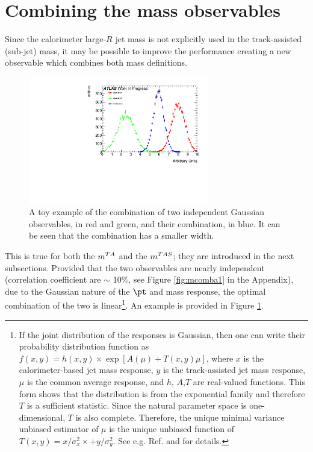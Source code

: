 \section{Combining the mass observables}


Since the calorimeter large-$R$ jet mass is not explicitly used in the track-assisted (sub-jet) mass, it may be possible to improve the performance creating a new observable which combines both mass definitions.


\begin{figure}[!ht]
  \centering
      \includegraphics[width=0.7\textwidth]{jet_part/mcomb/example.pdf}
  \caption[Toy example of Gaussian combination]{A toy example of the combination of two independent Gaussian observables, in red and green, and their combination, in blue. It can be seen that the combination has a smaller width.}
  \label{fig:mcomb1}
\end{figure}

This is true for both the $m^{TA}$ and the $m^{TAS}$; they are introduced in the next subsections.
Provided that the two observables are nearly independent (correlation coefficient are $\sim$ 10\%, see Figure \ref{fig:mcomba1} in the Appendix), due to the Gaussian nature of the $\pt$ and mass response, the optimal combination of the two is linear\footnote{If the joint distribution of the responses is Gaussian, then one can write their probability distribution function as $f(x,y)=h(x,y)\times \exp[A(\mu)+T(x,y)\mu]$, where $x$ is the calorimeter-based jet mass response, $y$ is the track-assisted jet mass response,
$\mu$ is the common average response, and $h$, $A$,$T$ are real-valued functions. This form shows that the distribution is from the exponential family and therefore $T$ is a sufficient statistic. Since the natural parameter space is one-dimensional, $T$ is also complete. Therefore, the unique minimal variance unbiased estimator of $\mu$ is the unique unbiased function of $T(x, y) =x/\sigma^2_x \times + y/\sigma^2_y$.
See e.g. Ref. \cite{statistic} and \cite{art35} for details.}.
An example is provided in Figure \ref{fig:mcomb1}.
